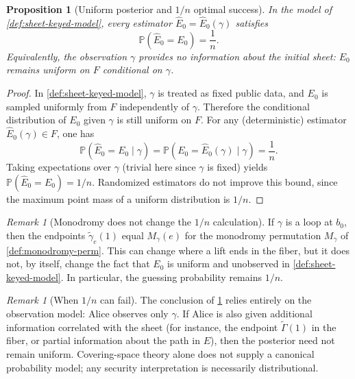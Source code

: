 \documentclass[11pt,a4paper]{article}
\newtheorem{proposition}[theorem]{Proposition}
\theoremstyle{definition}
\theoremstyle{remark}
\newtheorem{remark}[theorem]{Remark}
\begin{document}
\begin{proposition}[Uniform posterior and \(1/n\) optimal success]
\label{prop:one-over-n}
In the model of \cref{def:sheet-keyed-model}, every estimator \(\widehat E_0=\widehat E_0(\gamma)\) satisfies
\[
\mathbb{P}(\widehat E_0 = E_0)=\frac{1}{n}.
\]
Equivalently, the observation \(\gamma\) provides no information about the initial sheet: \(E_0\) remains uniform on \(F\) conditional on \(\gamma\).
\end{proposition}

\begin{proof}
In \cref{def:sheet-keyed-model}, \(\gamma\) is treated as fixed public data, and \(E_0\) is sampled uniformly from \(F\) independently of \(\gamma\). Therefore the conditional distribution of \(E_0\) given \(\gamma\) is still uniform on \(F\). For any (deterministic) estimator \(\widehat E_0(\gamma)\in F\), one has
\[
\mathbb{P}(\widehat E_0 = E_0 \mid \gamma)=\mathbb{P}(E_0=\widehat E_0(\gamma)\mid \gamma)=\frac{1}{n}.
\]
Taking expectations over \(\gamma\) (trivial here since \(\gamma\) is fixed) yields \(\mathbb{P}(\widehat E_0=E_0)=1/n\). Randomized estimators do not improve this bound, since the maximum point mass of a uniform distribution is \(1/n\).
\end{proof}

\begin{remark}[Monodromy does not change the \(1/n\) calculation]
\label{rem:monodromy-does-not-help}
If \(\gamma\) is a loop at \(b_0\), then the endpoints \(\tilde\gamma_e(1)\) equal \(M_\gamma(e)\) for the monodromy permutation \(M_\gamma\) of \cref{def:monodromy-perm}. This can change where a lift ends in the fiber, but it does not, by itself, change the fact that \(E_0\) is uniform and unobserved in \cref{def:sheet-keyed-model}. In particular, the guessing probability remains \(1/n\).
\end{remark}

\begin{remark}[When \(1/n\) can fail]
\label{rem:side-information}
The conclusion of \cref{prop:one-over-n} relies entirely on the observation model: Alice observes only \(\gamma\). If Alice is also given additional information correlated with the sheet (for instance, the endpoint \(\tilde\Gamma(1)\) in the fiber, or partial information about the path in \(E\)), then the posterior need not remain uniform. Covering-space theory alone does not supply a canonical probability model; any security interpretation is necessarily distributional.
\end{remark}
\end{document}
